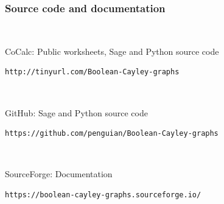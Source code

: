 \documentclass[pdf,sprung,slideColor,nocolorBG]{beamer}
\newenvironment{colortheme}[1]{
\def\ProvidesPackageRCS $##1${\relax}
\renewcommand{\ProcessOptions}{\relax}
\makeatletter

\makeatother
}{}
\begin{document}
\begin{colortheme}{jubata}

\begin{frame}[fragile]
\frametitle{Source code and documentation}
~

CoCalc: Public worksheets, Sage and Python source code

\begin{verbatim}
http://tinyurl.com/Boolean-Cayley-graphs
\end{verbatim}

~

GitHub: Sage and Python source code

\begin{verbatim}
https://github.com/penguian/Boolean-Cayley-graphs
\end{verbatim}

~

SourceForge: Documentation

\begin{verbatim}
https://boolean-cayley-graphs.sourceforge.io/
\end{verbatim}
\end{frame}

\end{colortheme}
\end{document}
